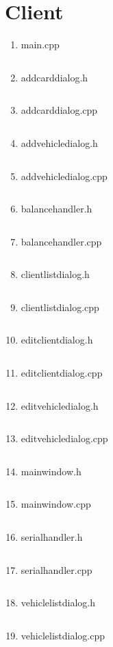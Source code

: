 \documentclass[a4paper, 12pt]{report}
\begin{document}
\section{Client}
\begin{enumerate}[left=0pt]
    \item main.cpp
    \inputminted{c++}{../SAPEIClient/main.cpp}
    \newpage
    \item addcarddialog.h
    \inputminted{c++}{../SAPEIClient/addcarddialog.h}
    \item addcarddialog.cpp
    \inputminted{c++}{../SAPEIClient/addcarddialog.cpp}
    \newpage
    \item addvehicledialog.h
    \inputminted{c++}{../SAPEIClient/addvehicledialog.h}
    \item addvehicledialog.cpp
    \inputminted{c++}{../SAPEIClient/addvehicledialog.cpp}
    \newpage
    \item balancehandler.h
    \inputminted{c++}{../SAPEIClient/balancehandler.h}
    \item balancehandler.cpp
    \inputminted{c++}{../SAPEIClient/balancehandler.cpp}
    \newpage
    \item clientlistdialog.h
    \inputminted{c++}{../SAPEIClient/clientlistdialog.h}
    \item clientlistdialog.cpp
    \inputminted{c++}{../SAPEIClient/clientlistdialog.cpp}
    \newpage
    \item editclientdialog.h
    \inputminted{c++}{../SAPEIClient/editclientdialog.h}
    \item editclientdialog.cpp
    \inputminted{c++}{../SAPEIClient/editclientdialog.cpp}
    \newpage
    \item editvehicledialog.h
    \inputminted{c++}{../SAPEIClient/editvehicledialog.h}
    \item editvehicledialog.cpp
    \inputminted{c++}{../SAPEIClient/editvehicledialog.cpp}
    \newpage
    \item mainwindow.h
    \inputminted{c++}{../SAPEIClient/mainwindow.h}
    \item mainwindow.cpp
    \inputminted{c++}{../SAPEIClient/mainwindow.cpp}
    \newpage
    \item serialhandler.h
    \inputminted{c++}{../SAPEIClient/serialhandler.h}
    \item serialhandler.cpp
    \inputminted{c++}{../SAPEIClient/serialhandler.cpp}
    \newpage
    \item vehiclelistdialog.h
    \inputminted{c++}{../SAPEIClient/vehiclelistdialog.h}
    \item vehiclelistdialog.cpp
    \inputminted{c++}{../SAPEIClient/vehiclelistdialog.cpp}
\end{enumerate}
\end{document}
